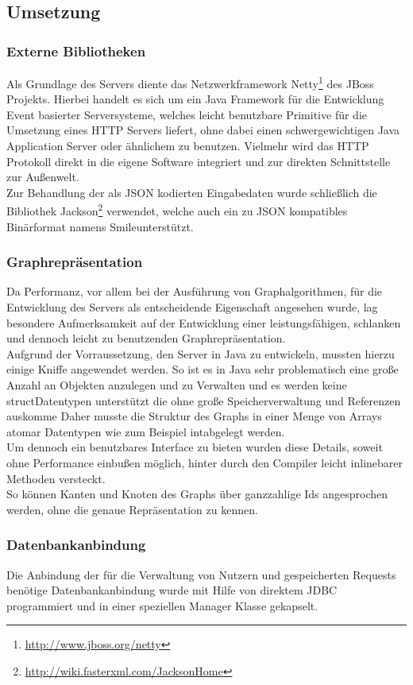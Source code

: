 \subsection*{Umsetzung}
\subsubsection*{Externe Bibliotheken}
Als Grundlage des Servers diente das Netzwerkframework Netty\footnote{\url{http://www.jboss.org/netty}} des JBoss Projekts. Hierbei handelt es sich um ein Java Framework für die Entwicklung Event basierter Serversysteme, welches leicht benutzbare Primitive für die Umsetzung eines HTTP Servers liefert, ohne dabei einen schwergewichtigen Java Application Server oder ähnlichem zu benutzen. Vielmehr wird das HTTP Protokoll direkt in die eigene Software integriert und zur direkten Schnittstelle zur Außenwelt.\\
Zur Behandlung der als JSON kodierten Eingabedaten wurde schließlich die Bibliothek Jackson\footnote{\url{http://wiki.fasterxml.com/JacksonHome}} verwendet, welche auch ein zu JSON kompatibles Binärformat namens \glqq Smile\grqq unterstützt.
\subsubsection*{Graphrepräsentation}
Da Performanz, vor allem bei der Ausführung von Graphalgorithmen, für die Entwicklung des Servers als entscheidende Eigenschaft angesehen wurde, lag besondere Aufmerksamkeit auf der Entwicklung einer leistungsfähigen, schlanken und dennoch leicht zu benutzenden Graphrepräsentation.\\
Aufgrund der Vorraussetzung, den Server in Java zu entwickeln, mussten hierzu einige Kniffe angewendet werden.
So ist es in Java sehr problematisch eine große Anzahl an Objekten anzulegen und zu Verwalten und es werden keine  \glqq struct\grqq Datentypen unterstützt die ohne große Speicherverwaltung und Referenzen auskomme
Daher musste die Struktur des Graphs in einer Menge von Arrays atomar Datentypen wie zum Beispiel \glqq int\grqq abgelegt werden.\\
Um dennoch ein benutzbares Interface zu bieten wurden diese Details, soweit ohne Performance einbußen möglich,  hinter durch den Compiler leicht inlinebarer Methoden versteckt.\\
So können Kanten und Knoten des Graphs über ganzzahlige Ids angesprochen werden, ohne die genaue Repräsentation zu kennen.
\subsubsection*{Datenbankanbindung}
Die Anbindung der für die Verwaltung von Nutzern und gespeicherten Requests benötige Datenbankanbindung wurde mit Hilfe von direktem JDBC programmiert und in einer speziellen Manager Klasse gekapselt.
